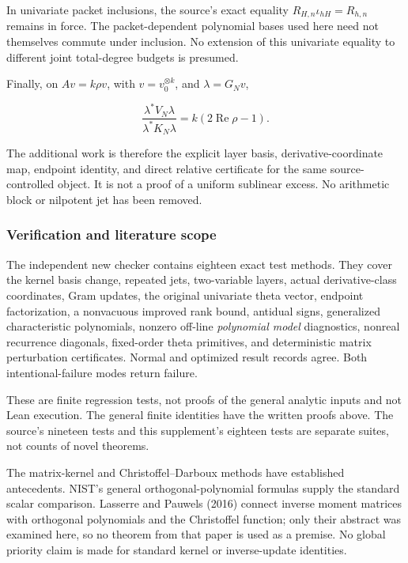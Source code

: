 In univariate packet inclusions, the source's exact equality
\(R_{H,n}\iota_{hH}=R_{h,n}\) remains in force. The packet-dependent
polynomial bases used here need not themselves commute under inclusion.
No extension of this univariate equality to different joint total-degree
budgets is presumed.

Finally, on \(Av=k\rho v\), with \(v=v_0^{\otimes k}\), and
\(\lambda=G_Nv\),

\[
\frac{\lambda^*V_N\lambda}{\lambda^*K_N\lambda}
=k(2\operatorname{Re}\rho-1).
\tag{30}
\]

The additional work is therefore the explicit layer basis,
derivative-coordinate map, endpoint identity, and direct relative
certificate for the same source-controlled object. It is not a proof of
a uniform sublinear excess. No arithmetic block or nilpotent jet has
been removed.

\subsubsection{Verification and literature
scope}\label{kernel_layer:verification-and-literature-scope}

The independent new checker contains eighteen exact test methods. They
cover the kernel basis change, repeated jets, two-variable layers,
actual derivative-class coordinates, Gram updates, the original
univariate theta vector, endpoint factorization, a nonvacuous improved
rank bound, antidual signs, generalized characteristic polynomials,
nonzero off-line \emph{polynomial model} diagnostics, nonreal recurrence
diagonals, fixed-order theta primitives, and deterministic matrix
perturbation certificates. Normal and optimized result records agree.
Both intentional-failure modes return failure.

These are finite regression tests, not proofs of the general analytic
inputs and not Lean execution. The general finite identities have the
written proofs above. The source's nineteen tests and this supplement's
eighteen tests are separate suites, not counts of novel theorems.

The matrix-kernel and Christoffel--Darboux methods have established
antecedents. NIST's general orthogonal-polynomial formulas supply the
standard scalar comparison. Lasserre and Pauwels (2016) connect inverse
moment matrices with orthogonal polynomials and the Christoffel
function; only their abstract was examined here, so no theorem from that
paper is used as a premise. No global priority claim is made for
standard kernel or inverse-update identities.


